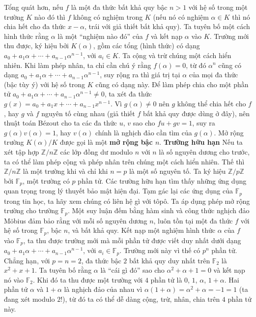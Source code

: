 \begin{multicols}{2}
	Tổng quát hơn, nếu $f$ là một đa thức bất khả quy bậc $n > 1$ với hệ số trong một trường $K$ nào đó thì $f$ không có nghiệm trong $K$ (nếu nó có nghiệm $\alpha \in K$ thì nó chia hết cho đa thức $x - \alpha$, trái với giả thiết bất khả quy). Ta tuyên bố một cách hình thức rằng $\alpha$ là một ``nghiệm nào đó'' của $f$ và kết nạp $\alpha$ vào $K$. Trường mới thu được, ký hiệu bởi $K(\alpha)$, gồm các tổng (hình thức) có dạng $a_0+a_1\alpha+\cdots+a_{n-1}\alpha^{n-1}$, với $a_i \in K$. Ta cộng và trừ chúng một cách hiển nhiên. Khi làm phép nhân, ta chỉ cần chú ý rằng $f(\alpha) = 0$, từ đó $\alpha^n$ cũng có dạng $a_0+a_1\alpha+\cdots+a_{n-1}\alpha^{n-1}$, suy rộng ra thì giá trị tại $\alpha$ của mọi đa thức (bậc tùy ý) với hệ số trong $K$ cũng có dạng này. Để làm phép chia cho một phần tử $a_0+a_1\alpha+\cdots+a_{n-1}\alpha^{n-1} \neq 0$, ta xét đa thức $g(x)= a_0+a_1x+\cdots+a_{n-1}x^{n-1}$. Vì $g(\alpha) \neq 0$ nên $g$ không thể chia hết cho $f$, hay $g$ và $f$ nguyên tố cùng nhau (giả thiết $f$ bất khả quy được dùng ở đây), nên thuật toán Bézout cho ta các đa thức $u$, $v$ sao cho $fu+gv=1$, suy ra $g(\alpha)v(\alpha) = 1$, hay $v(\alpha)$ chính là nghịch đảo cần tìm của $g(\alpha)$. Mở rộng trường $K(\alpha)/K$ được gọi là một {\bf\color{duongvaotoanhoc} mở rộng bậc $n$}.
	\vskip 0.1cm
	\textbf{\color{duongvaotoanhoc}Trường hữu hạn}
	\vskip 0.1cm
	Nếu ta xét tập hợp $\mathbb{Z}/n\mathbb{Z}$ các lớp đồng dư modulo $n$ với $n$ là số nguyên dương cho trước, ta có thể làm phép cộng và phép nhân trên chúng một cách hiển nhiên. Thế thì $\mathbb{Z}/n\mathbb{Z}$ là một trường khi và chỉ khi $n = p$ là một số nguyên tố. Ta ký hiệu $\mathbb{Z}/p\mathbb{Z}$ bởi $\mathbb{F}_p$, một trường có $p$ phần tử. Các trường hữu hạn tìm thấy những ứng dụng quan trọng trong lý thuyết bảo mật hiện đại. 
	\vskip 0.1cm
	Tạm gác lại các ứng dụng của $\mathbb{F}_p$ trong tin học, ta hãy xem chúng có liên hệ gì với tôpô. Ta áp dụng phép mở rộng trường cho trường $\mathbb{F}_p$. Một suy luận đếm bằng hàm sinh và công thức nghịch đảo M\"obius đảm bảo rằng với mỗi số nguyên dương $n$, luôn tồn tại một đa thức $f$ với hệ số trong $\mathbb{F}_p$, bậc $n$, và bất khả quy. Kết nạp một nghiệm hình thức $\alpha$ của $f$ vào $\mathbb{F}_p$, ta thu được trường mới mà mỗi phần tử được viết duy nhất dưới dạng $a_0+a_1\alpha+\cdots+a_{n-1}\alpha^{n-1}$, với $a_i \in \mathbb{F}_p$. Trường mới này vì thế có $p^n$ phần tử.
	\vskip 0.1cm
	Chẳng hạn, với $p = n = 2$, đa thức bậc $2$ bất khả quy duy nhất trên $\mathbb{F}_2$ là $x^2+x+1$. Ta tuyên bố rằng $\alpha$ là ``cái gì đó'' sao cho $\alpha^2 + \alpha + 1 = 0$ và kết nạp nó vào $\mathbb{F}_2$. Khi đó ta thu được một trường với $4$ phần tử là $0$, $1$, $\alpha$, $1 + \alpha$. Hai phần tử $\alpha$ và $1 + \alpha$ là nghịch đảo của nhau vì $\alpha(1 + \alpha) = \alpha^2 + \alpha = -1 = 1$ (ta đang xét modulo $2$!), từ đó ta có thể dễ dàng cộng, trừ, nhân, chia trên $4$ phần tử này.

\end{multicols}
